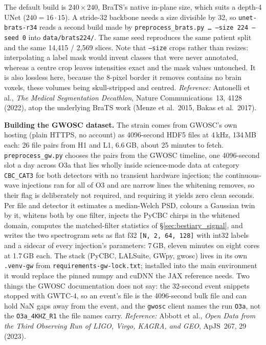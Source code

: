 \smallskip\noindent The default build is $240 \times 240$, BraTS's native
in-plane size, which suits a depth-4 UNet ($240 = 16 \cdot 15$). A stride-32
backbone needs a size divisible by 32, so \texttt{unet-brats-r34} reads a
second build made by \texttt{preprocess\_brats.py \dots{} --size 224 --seed 0}
into \texttt{data/brats224/}. The same seed reproduces the same patient split
and the same 14{,}415 / 2{,}569 slices. Note that \texttt{--size} crops
rather than resizes: interpolating a label mask would invent classes that were
never annotated, whereas a centre crop leaves intensities exact and the mask
values untouched. It is also lossless here, because the 8-pixel border it
removes contains no brain voxels, these volumes being skull-stripped and
centred.
\emph{Reference:} Antonelli et al., \emph{The Medical Segmentation
Decathlon}, Nature Communications~13, 4128 (2022), atop the underlying
BraTS work (Menze et al.\ 2015, Bakas et al.\ 2017).

\medskip\noindent\textbf{Building the GWOSC dataset.} The strain comes from
GWOSC's own hosting (plain HTTPS, no account) as 4096-second HDF5 files at
4\,kHz, 134\,MB each: 26 file pairs from H1 and L1, 6.6\,GB, about 25 minutes
to fetch. \texttt{preprocess\_gw.py} chooses the pairs from the GWOSC
timeline, one 4096-second slot a day across O3a that lies wholly inside
science-mode data at category \texttt{CBC\_CAT3} for both detectors with no
transient hardware injection; the continuous-wave injections ran for all of
O3 and are narrow lines the whitening removes, so their flag is deliberately
not required, and requiring it yields zero clean seconds. Per file and
detector it estimates a median-Welch PSD, colours a Gaussian twin by it,
whitens both by one filter, injects the PyCBC chirps in the whitened domain,
computes the matched-filter statistics of \S\ref{sec:bestiary_signal}, and
writes the two spectrogram sets as flat f32 \texttt{[N, 2, 64, 128]} with
int32 labels and a sidecar of every injection's parameters: 7\,GB, eleven
minutes on eight cores at 1.7\,GB each. The stack (PyCBC, LALSuite, GWpy,
gwosc) lives in its own \texttt{.venv-gw} from
\texttt{requirements-gw-lock.txt}; installed into the main environment it
would replace the pinned numpy and cuDNN the JAX reference needs. Two things
the GWOSC documentation does not say: the 32-second event snippets stopped
with GWTC-4, so an event's file is the 4096-second bulk file and can hold NaN
gaps away from the event, and the \texttt{gwosc} client names the run
\texttt{O3a}, not the \texttt{O3a\_4KHZ\_R1} the file names carry.
\emph{Reference:} Abbott et al., \emph{Open Data from the Third Observing Run
of LIGO, Virgo, KAGRA, and GEO}, ApJS~267, 29 (2023).

